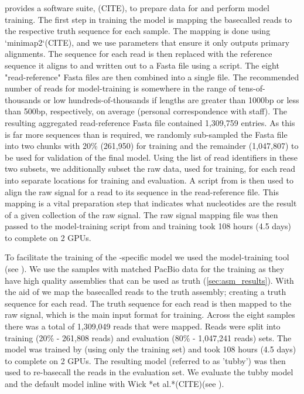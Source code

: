 \ont{} provides a software suite, \taiyaki{}(CITE), to prepare data for and perform model training. The first step in training the model is mapping the \ont{} basecalled reads to the respective truth sequence for each sample. The mapping is done using `minimap2`(CITE), and we use parameters that ensure it only outputs primary alignments. The sequence for each read is then replaced with the reference sequence it aligns to and written out to a Fasta file using a \taiyaki{} script. The eight "read-reference" Fasta files are then combined into a single file. The recommended number of reads for model-training is somewhere in the range of tens-of-thousands or low hundreds-of-thousands if lengths are greater than 1000bp or less than 500bp, respectively, on average (personal correspondence with \ont{} staff). The resulting aggregated read-reference Fasta file contained 1,309,759 entries. As this is far more sequences than is required, we randomly sub-sampled the Fasta file into two chunks with 20\% (261,950) for training and the remainder (1,047,807) to be used for validation of the final model. Using the list of read identifiers in these two subsets, we additionally subset the raw data, used for training, for each read into separate locations for training and evaluation. A script from \taiyaki{} is then used to align the raw signal for a read to its sequence in the read-reference file. This mapping is a vital preparation step that indicates what nucleotides are the result of a given collection of the raw signal. The raw signal mapping file was then passed to the model-training script from \taiyaki{} and training took 108 hours (4.5 days) to complete on 2 GPUs.



To facilitate the training of the \mtb{}-specific model we used the \ont{} model-training tool \taiyaki{} (see ). We use the samples with matched PacBio data for the training as they have high quality assemblies that can be used as truth (\autoref{sec:asm_results}). With the aid of \taiyaki{} we map the basecalled \ont{} reads to the truth assembly; creating a truth sequence for each read. The truth sequence for each read is then mapped to the raw signal, which is the main input format for training. Across the eight samples there was a total of 1,309,049 \ont{} reads that were mapped. Reads were split into training (20\% - 261,808 reads) and evaluation (80\% - 1,047,241 reads) sets. The model was trained by \taiyaki{} (using only the training set) and took 108 hours (4.5 days) to complete on 2 GPUs. The resulting \mtb{} model (referred to as 'tubby') was then used to re-basecall the reads in the evaluation set. We evaluate the tubby model and the default \guppy{} model inline with Wick *et al.*(CITE)(see ).

